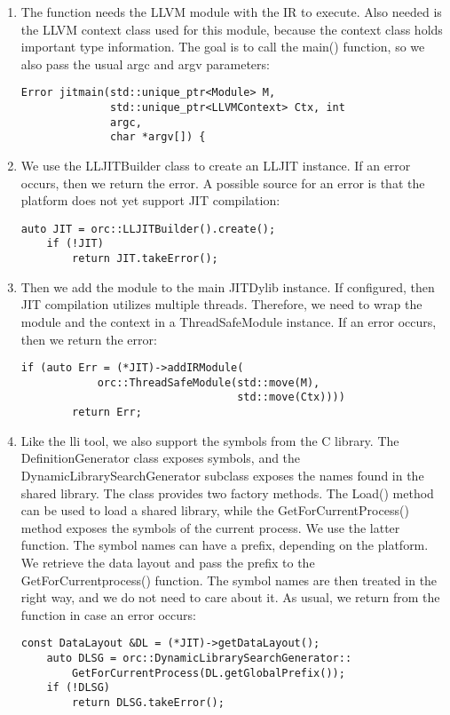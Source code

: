 \begin{enumerate}
\item The function needs the LLVM module with the IR to execute. Also needed is the LLVM context class used for this module, because the context class holds important type information. The goal is to call the main() function, so we also pass the usual argc and argv parameters:
\begin{lstlisting}[caption={}]
Error jitmain(std::unique_ptr<Module> M,
			  std::unique_ptr<LLVMContext> Ctx, int 
			  argc,
			  char *argv[]) {
\end{lstlisting}

\item We use the LLJITBuilder class to create an LLJIT instance. If an error occurs, then we return the error. A possible source for an error is that the platform does not yet support JIT compilation:
\begin{lstlisting}[caption={}]
	auto JIT = orc::LLJITBuilder().create();
	if (!JIT)
		return JIT.takeError();
\end{lstlisting}

\item Then we add the module to the main JITDylib instance. If configured, then JIT compilation utilizes multiple threads. Therefore, we need to wrap the module and the context in a ThreadSafeModule instance. If an error occurs, then we return the error:
\begin{lstlisting}[caption={}]
	if (auto Err = (*JIT)->addIRModule(
			orc::ThreadSafeModule(std::move(M),
								  std::move(Ctx))))
		return Err;
\end{lstlisting}

\item Like the lli tool, we also support the symbols from the C library. The DefinitionGenerator class exposes symbols, and the DynamicLibrarySearchGenerator subclass exposes the names found in the shared library. The class provides two factory methods. The Load() method can be used to load a shared library, while the GetForCurrentProcess() method exposes the symbols of the current process. We use the latter function. The symbol names can have a prefix, depending on the platform. We retrieve the data layout and pass the prefix to the GetForCurrentprocess() function. The symbol names are then treated in the right way, and we do not need to care about it. As usual, we return from the function in case an error occurs:
\begin{lstlisting}[caption={}]
	const DataLayout &DL = (*JIT)->getDataLayout();
	auto DLSG = orc::DynamicLibrarySearchGenerator::
		GetForCurrentProcess(DL.getGlobalPrefix());
	if (!DLSG)
		return DLSG.takeError();
\end{lstlisting}


\end{enumerate}
